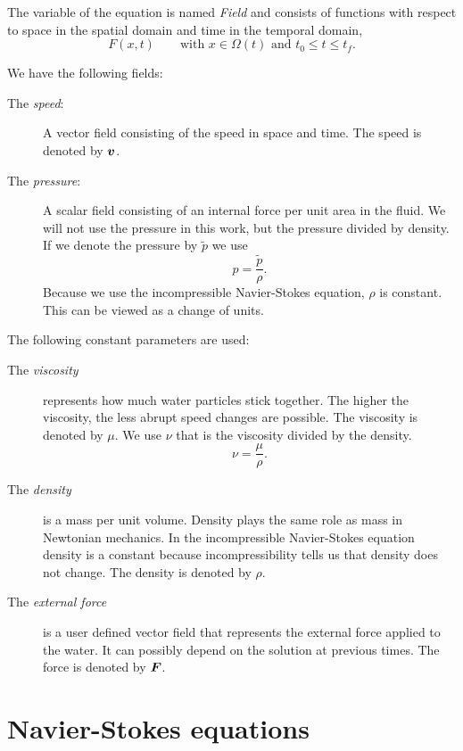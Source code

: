 The variable of the equation is named \emph{Field} and consists of functions with respect to space in the spatial domain and time in the temporal domain,
\begin{equation}
 F(x,t)\qquad \text{with $x\in\Omega(t)$ and $t_0\leq t \leq t_f$.}
\end{equation}

We have the following fields:
\begin{description}
\item[The \emph{speed}:] A vector field consisting of the speed in space and time.
The speed is denoted by ${\boldsymbol {v}}$.
\item[The \emph{pressure}:] A scalar field consisting of an internal force per unit area in the fluid.
We will not use the pressure in this work, but the pressure divided by density.
If we denote the pressure by $\tilde{p}$ we use
\begin{equation}
 p=\frac{\tilde{p}}{\rho}.
\end{equation}
Because we use the incompressible Navier-Stokes equation, $\rho$ is constant. This can be viewed as a change of units.
\end{description}

The following constant parameters are used:
\begin{description}
\item[The \emph{viscosity}] represents how much water particles stick together.
The higher the viscosity, the less abrupt speed changes are possible.
The viscosity is denoted by $\mu$. We use $\nu$ that is the viscosity divided by the density.
\begin{equation}
 \nu=\frac{\mu}{\rho}.
\end{equation}
\item[The \emph{density}] is a mass per unit volume.
Density plays the same role as mass in Newtonian mechanics.
In the incompressible Navier-Stokes equation density is a constant because incompressibility tells us that density does not change.
The density is denoted by $\rho$.
\item[The \emph{external force}] is a user defined vector field that represents the external force applied to the water.
It can possibly depend on the solution at previous times.
The force is denoted by ${\boldsymbol {F}}$.
\end{description}

\section{Navier-Stokes equations}

